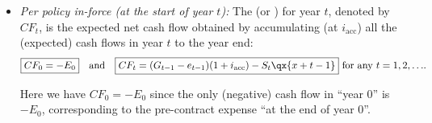 \begin{enumerate}
\begin{itemize}
\item \emph{Per policy in-force (at the start of year \(t\)):} The
 (or )
for year \(t\), denoted by \(CF_{t}\), is the expected net cash flow obtained
by accumulating (at \(i_{\mathrm{acc}}\)) all the (expected) cash flows in year
\(t\) to the year end:
\[
\boxed{CF_{0}=-E_0}\qqtext{and}
\boxed{CF_{t}=(G_{t-1}-e_{t-1})(1+i_{\mathrm{acc}})-S_t\qx{x+t-1}}\text{ for any \(t=1,2,\dotsc\)}.
\]
\begin{center}
\end{center}
Here we have \(CF_0=-E_0\) since the only (negative) cash flow in ``year 0'' is
\(-E_0\), corresponding to the pre-contract expense ``at the end of year 0''.


\end{itemize}
\end{enumerate}
